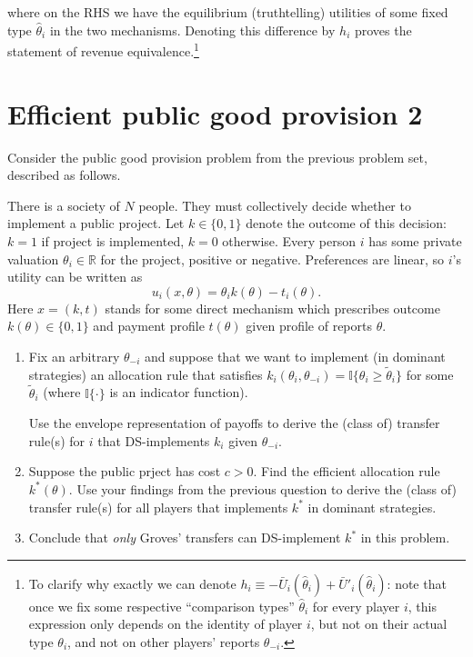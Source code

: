 \documentclass[a4paper]{article}
\begin{document}
	where on the RHS we have the equilibrium (truthtelling) utilities of some fixed type $\hat{\theta}_i$ in the two mechanisms. Denoting this difference by $h_i$ proves the statement of revenue equivalence.\footnote{To clarify why exactly we can denote $h_i \equiv -\bar{U}_i(\hat{\theta}_i) + \bar{U}'_i(\hat{\theta}_i)$: note that once we fix some respective ``comparison types'' $\hat{\theta}_i$ for every player $i$, this expression only depends on the identity of player $i$, but not on their actual type $\theta_i$, and not on other players' reports $\theta_{-i}$.}
\fi


\section{Efficient public good provision 2}

	Consider the public good provision problem from the previous problem set, described as follows.
	
	There is a society of $N$ people. They must collectively decide whether to implement a public project. Let $k \in \{0,1\}$ denote the outcome of this decision: $k=1$ if project is implemented, $k=0$ otherwise. Every person $i$ has some private valuation $\theta_i \in \mathbb{R}$ for the project, positive or negative. Preferences are linear, so $i$'s utility can be written as
	$$
		u_i(x,\theta) = \theta_i k(\theta) - t_i(\theta).
	$$
	Here $x=(k,t)$ stands for some direct mechanism which prescribes outcome $k(\theta) \in \{0,1\}$ and payment profile $t(\theta)$ given profile of reports $\theta$.
	
	\begin{enumerate}
		\item Fix an arbitrary $\theta_{-i}$ and suppose that we want to implement (in dominant strategies) an allocation rule that satisfies $k_i(\theta_i, \theta_{-i}) = \mathbb{I}\{\theta_i \geq \tilde{\theta}_i \}$ for some $\tilde{\theta}_i$ (where $\mathbb{I}\{\cdot\}$ is an indicator function).
		
		Use the envelope representation of payoffs to derive the (class of) transfer rule(s) for $i$ that DS-implements $k_i$ given $\theta_{-i}$.
		
		\item Suppose the public prject has cost $c > 0$. Find the efficient allocation rule $k^*(\theta)$. Use your findings from the previous question to derive the (class of) transfer rule(s) for all players that implements $k^*$ in dominant strategies.
		
		\item Conclude that \emph{only} Groves' transfers can DS-implement $k^*$ in this problem.
	\end{enumerate}
\end{document}
